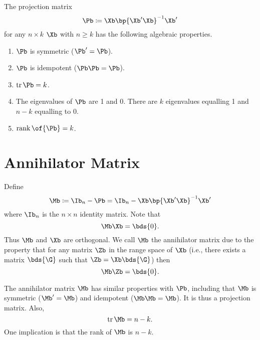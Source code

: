 \begin{theorem}
    The projection matrix 
    $$
    \Pb \coloneqq \Xb \bp{\Xb^\prime \Xb}^{-1} \Xb^\prime
    $$ 
    for any $n \times k$ $\Xb$ with $n \geq k$ has the following algebraic properties.

    \begin{enumerate}[topsep=10pt, leftmargin=20pt, itemsep=0pt, label=(\arabic*)]
        \setlength{\parskip}{10pt} 
        \item $\Pb$ is symmetric ($\Pb^\prime = \Pb$).
        \item $\Pb$ is idempotent ($\Pb \Pb = \Pb$).
        \item $\operatorname*{tr} \Pb = k$.
        \item The eigenvalues of $\Pb$ are 1 and 0. There are $k$ eigenvalues equalling 1 and $n-k$ equalling to 0.
        \item $\operatorname*{rank}\of{\Pb} = k$.
    \end{enumerate}
\end{theorem}


\section{Annihilator Matrix}

Define 
\begin{equation}
    \notag
    \Mb \coloneqq \Ib_n - \Pb = \Ib_n - \Xb \bp{\Xb^\prime \Xb}^{-1} \Xb^\prime
\end{equation}
where $\Ib_n$ is the $n \times n$ identity matrix. Note that
\begin{equation}
    \label{hansen_eq_3_21}
    \Mb \Xb = \bds{0}.
\end{equation}
Thus $\Mb$ and $\Xb$ are orthogonal. We call $\Mb$ the annihilator matrix due to the property that for any matrix $\Zb$ in the range space of $\Xb$ (i.e., there exists a matrix $\bds{\G}$ such that $\Zb = \Xb \bds{\G}$) then
\begin{equation}
    \notag
    \Mb \Zb = \bds{0}.
\end{equation}

The annihilator matrix $\Mb$ has similar properties with $\Pb$, including that $\Mb$ is symmetric ($\Mb^\prime = \Mb$) and idempotent ($\Mb \Mb = \Mb$). It is thus a projection matrix. Also,
\begin{equation}
    \label{hansen_eq_3_22}
    \operatorname*{tr} \Mb = n - k.
\end{equation}
One implication is that the rank of $\Mb$ is $n-k$.

